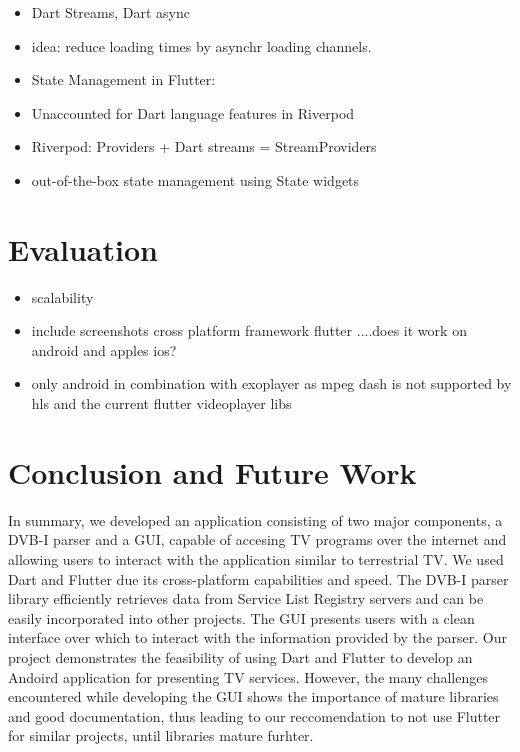 \documentclass[conference]{IEEEtran}
\begin{document}
\begin{itemize}
	\item Dart Streams, Dart async
	\item idea: reduce loading times by asynchr loading channels. 
	\item State Management in Flutter: 
	\item Unaccounted for Dart language features in Riverpod
	\item Riverpod: Providers + Dart streams = StreamProviders
	\item out-of-the-box state management using State widgets
\end{itemize}	

\section{Evaluation}




\begin{itemize}
	\item scalability
	\item include screenshots cross platform framework flutter ....does it work on android and apples ios?
	\item only android in combination with exoplayer as mpeg dash is not supported by hls and the current flutter videoplayer libs
\end{itemize}



\section{Conclusion and Future Work}
In summary, we developed an application consisting of two major components, a DVB-I parser and a GUI, capable of accesing TV programs over the internet and allowing users to interact with the application similar to terrestrial TV.  We used Dart and Flutter due its cross-platform capabilities and speed. The DVB-I parser library efficiently retrieves data from Service List Registry servers and can be easily incorporated into other projects. The GUI presents users with a clean interface over which to interact with the information provided by the parser. Our project demonstrates the feasibility of using Dart and Flutter to develop an Andoird application for presenting TV services. However, the many challenges encountered while developing the GUI shows the importance of mature libraries and good documentation, thus leading to our reccomendation to not use Flutter for similar projects, until libraries mature furhter. \\\par
\end{document}
